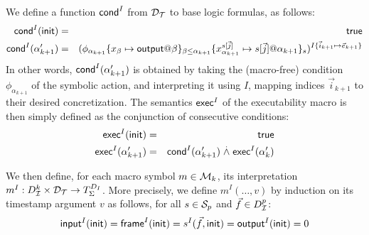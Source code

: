 We define a function $\textsf{cond}^I$ from $\mathcal{D}_{\mathcal{T}}$
to base logic formulas, as follows:
\begin{eqnarray*}
  \mcond^I(\tinit) &=& \true \\
  \mcond^I(\alpha'_{k+1}) &=&
    \interp{\phi_{\alpha_{k+1}}
    \{x_\beta\mapsto\mout@\beta\}_{\beta\leq \alpha_{k+1}}
    \{x_{\alpha_{k+1}}^{s[\vec{j}]}\mapsto
      s[\vec{j}]@\alpha_{k+1}\}_s
    }^{I\{\vec{i}_{k+1}\mapsto\vec{e}_{k+1}\}}
\end{eqnarray*}
In other words, $\textsf{cond}^I(\alpha'_{k+1})$ is obtained by taking the
(macro-free) condition $\phi_{\alpha_{k+1}}$ of the symbolic action, and
interpreting it using $I$, mapping indices $\vec{i}_{k+1}$ to their
desired concretization.
The semantics $\textsf{exec}^I$ of the executability macro is then simply defined as
the conjunction of consecutive conditions:
\begin{eqnarray*}
  \textsf{exec}^I(\mathsf{init}) &=& \textsf{true} \\
  \textsf{exec}^I(\alpha'_{k+1}) &=&
    \textsf{cond}^I(\alpha'_{k+1})
    \stackrel{.}{\wedge}
    \textsf{exec}^I(\alpha'_k)
\end{eqnarray*}

We then define, for each macro symbol $m\in\mathcal{M}_k$,
its interpretation $m^I : D_{\mathcal{I}}^k \times \mathcal{D}_{\mathcal{T}} \to T_\Sigma^{D_I}$.
More precisely, we define $m^I(\ldots,v)$ by induction on its timestamp
argument $v$ as follows, for all $s \in \mathcal{S}_p$ and $\vec{f} \in D_{\mathcal{I}}^p$:
\[
    \textsf{input}^I(\mathsf{init}) = \textsf{frame}^I(\mathsf{init}) = s^I(\vec{f},\mathsf{init})
    = \textsf{output}^I(\mathsf{init}) = 0\]

